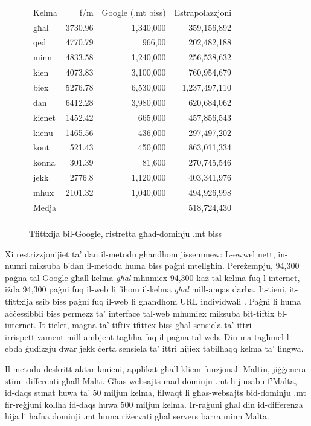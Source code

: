 \begin{multicols}{2}
\begin{figure}[p]
\setlength{\tabcolsep}{3.1em}
\begin{tabularx}{\textwidth}{lrrr} \toprule\addlinespace
Kelma & f/m & Google (.mt biss) & Estrapolazzjoni \\ \addlinespace\midrule\addlinespace
għal & 3730.96 & 1,340,000 & 359,156,892 \\
qed	& 4770.79 & 966,00  &  202,482,188  \\
minn & 4833.58 & 1,240,000  &  256,538,632 \\
kien & 4073.83 & 3,100,000  &  760,954,679 \\
biex & 5276.78 & 6,530,000  & 1,237,497,110 \\
dan	& 6412.28  & 3,980,000  & 620,684,062  \\
kienet & 1452.42  & 665,000 &  457,856,543 \\
kienu & 1465.56  & 436,000  & 297,497,202  \\
kont & 521.43  & 450,000  &  863,011,334 \\
konna & 301.39  & 81,600  &   270,745,546\\
jekk & 2776.8  &  1,120,000 & 403,341,976 \\
mhux & 2101.32  & 1,040,000  &  494,926,998 \\ \addlinespace\midrule\addlinespace
Medja & & & 518,724,430 \\ \addlinespace\bottomrule
\end{tabularx} 
\caption{Tfittxija bil-Google, ristretta għad-dominju .mt biss}
\label{table:Google_B_mt}
\end{figure}

Xi restrizzjonijiet ta’ dan il-metodu għandhom jissemmew: L-ewwel nett, in-numri miksuba b’dan il-metodu huma biss paġni mtellgħin. Pereżempju, 94,300 paġna tal-Google għall-kelma \emph{għal} mhumiex 94,300 każ tal-kelma fuq l-internet, iżda 94,300 paġni fuq il-web li fihom il-kelma \emph{għal} mill-anqas darba. It-tieni, it-tfittxija ssib biss paġni fuq il-web li għandhom URL individwali \cite{Kilgarriff-Grefenstette:2003}. Paġni li huma aċċessibbli biss permezz ta’ interface tal-web mhumiex miksuba bit-tiftix bl-internet. It-tielet, magna ta’ tiftix tfittex biss għal sensiela ta’ ittri irrispettivament mill-ambjent tagħha fuq il-paġna tal-web. Din ma tagħmel l-ebda ġudizzju dwar jekk ċerta sensiela ta’ ittri hijiex tabilħaqq kelma ta’ lingwa.
    
Il-metodu deskritt aktar kmieni, applikat għall-kliem funzjonali Maltin, jiġġenera stimi differenti għall-Malti. Għas-websajts mad-dominju .mt li jinsabu f'Malta, id-daqs stmat huwa ta’ 50 miljun kelma, filwaqt li għas-websajts bid-dominju .mt fir-reġjuni kollha id-daqs huwa 500 miljun kelma. Ir-raġuni għal din id-differenza hija li ħafna dominji .mt huma riżervati għal servers barra minn Malta.
    

\end{multicols}
